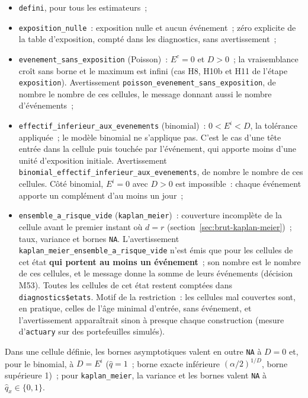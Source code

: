 \documentclass[a4paper,11pt]{article}
\newcommand{\code}[1]{\texttt{\small #1}}
\begin{document}
\begin{itemize}[leftmargin=*, itemsep=2pt]
  \item \code{defini}, pour tous les estimateurs~;
  \item \code{exposition\_nulle}~: exposition nulle et aucun événement~;
    zéro explicite de la table d'exposition, compté dans les diagnostics,
    sans avertissement~;
  \item \code{evenement\_sans\_exposition} (Poisson)~: $E^c = 0$ et $D > 0$~;
    la vraisemblance croît sans borne et le maximum est infini (cas H8, H10b
    et H11 de l'étape \code{exposition}). Avertissement
    \code{poisson\_evenement\_sans\_exposition}, de nombre le nombre de ces
    cellules, le message donnant aussi le nombre d'événements~;
  \item \code{effectif\_inferieur\_aux\_evenements} (binomial)~:
    $0 < E^i < D$, la tolérance appliquée~; le modèle binomial ne s'applique
    pas. C'est le cas d'une tête entrée dans la cellule puis touchée par
    l'événement, qui apporte moins d'une unité d'exposition initiale.
    Avertissement \code{binomial\_effectif\_inferieur\_aux\_evenements}, de
    nombre le nombre de ces cellules. Côté binomial, $E^i = 0$ avec $D > 0$
    est impossible~: chaque événement apporte un complément d'au moins un
    jour~;
  \item \code{ensemble\_a\_risque\_vide} (\code{kaplan\_meier})~: couverture
    incomplète de la cellule avant le premier instant où $d = r$
    (section~\ref{sec:brut-kaplan-meier})~; taux, variance et bornes
    \code{NA}. L'avertissement \code{kaplan\_meier\_}\allowbreak\code{ensemble\_a\_risque\_vide}
    n'est émis que pour les cellules de cet état \textbf{qui portent au moins
    un événement}~; son nombre est le nombre de ces cellules, et le message
    donne la somme de leurs événements (décision M53). Toutes les cellules de
    cet état restent comptées dans \code{diagnostics\$etats}. Motif de la
    restriction~: les cellules mal couvertes sont, en pratique, celles de
    l'âge minimal d'entrée, sans événement, et l'avertissement apparaîtrait
    sinon à presque chaque construction (mesure d'\code{actuary} sur des
    portefeuilles simulés).
\end{itemize}

\noindent
Dans une cellule définie, les bornes asymptotiques valent en outre
\code{NA} à $D = 0$ et, pour le binomial, à $D = E^i$ ($\hat q = 1$~; borne
exacte inférieure $(\alpha/2)^{1/D}$, borne supérieure 1)~; pour
\code{kaplan\_meier}, la variance et les bornes valent \code{NA} à
$\hat q_x \in \{0, 1\}$.
\end{document}
